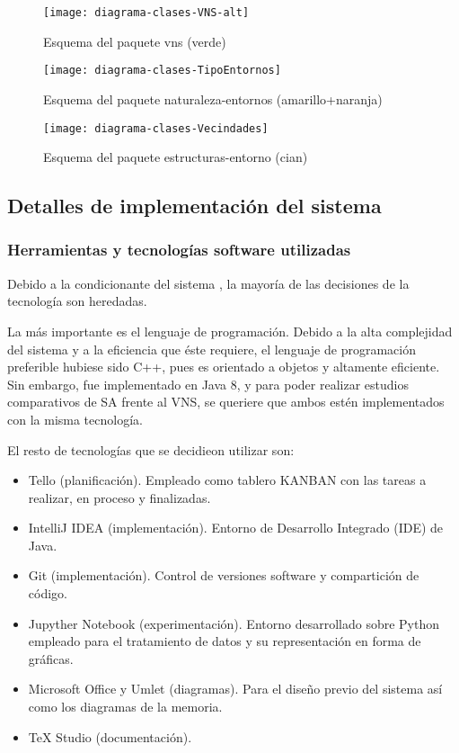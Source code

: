 \begin{figure}[htbp]
	\centering
	\texttt{[image: diagrama-clases-VNS-alt]}
	\caption{Esquema del paquete vns (verde)}
	\label{fig:4:diseño:vns}
\end{figure}

\begin{figure}[htbp]
	\centering
	\texttt{[image: diagrama-clases-TipoEntornos]}
	\caption{Esquema del paquete naturaleza-entornos (amarillo+naranja)}
	\label{fig:4:diseño:tipoEntorno}
\end{figure}

\begin{figure}[htbp]
	\centering
	\texttt{[image: diagrama-clases-Vecindades]}
	\caption{Esquema del paquete estructuras-entorno (cian)}
	\label{fig:4:diseño:entornos}
\end{figure}


\subsection{Detalles de implementación del sistema}
\label{sec:4:implementacion}

\subsubsection{Herramientas y tecnologías software utilizadas}

Debido a la condicionante del sistema \legacy{}, la mayoría de las decisiones de la tecnología son heredadas. 

La más importante es el lenguaje de programación. Debido a la alta complejidad del sistema y a la eficiencia que éste requiere, el lenguaje de programación preferible hubiese sido C++, pues es orientado a objetos y altamente eficiente. Sin embargo, \legacy{} fue implementado en Java 8, y para poder realizar estudios comparativos de SA frente al VNS, se queriere que ambos estén implementados con la misma tecnología.

El resto de tecnologías que se decidieon utilizar son:

\begin{itemize}
	\item Tello (planificación). Empleado como tablero KANBAN con las tareas a realizar, en proceso y finalizadas.
	\item IntelliJ IDEA (implementación). Entorno de Desarrollo Integrado (IDE) de Java.
	\item Git (implementación). Control de versiones software y compartición de código.
	\item Jupyther Notebook (experimentación). Entorno desarrollado sobre Python empleado para el tratamiento de datos y su representación en forma de gráficas.
	\item Microsoft Office y Umlet (diagramas). Para el diseño previo del sistema así como los diagramas de la memoria.
	\item \TeX{} Studio (documentación).
\end{itemize}

